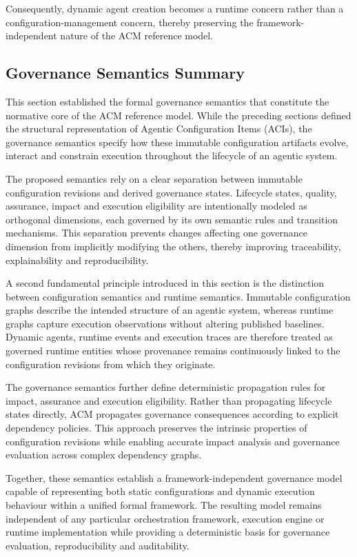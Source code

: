 \documentclass[10pt]{article}
\begin{document}
Consequently, dynamic agent creation becomes a runtime concern rather than a
configuration-management concern, thereby preserving the framework-independent
nature of the ACM reference model.

\subsection{Governance Semantics Summary}
\label{subsec:governance_summary}

This section established the formal governance semantics that constitute the
normative core of the ACM reference model. While the preceding sections defined
the structural representation of Agentic Configuration Items (ACIs), the
governance semantics specify how these immutable configuration artifacts evolve,
interact and constrain execution throughout the lifecycle of an agentic system.

The proposed semantics rely on a clear separation between immutable
configuration revisions and derived governance states. Lifecycle states,
quality, assurance, impact and execution eligibility are intentionally modeled
as orthogonal dimensions, each governed by its own semantic rules and
transition mechanisms. This separation prevents changes affecting one
governance dimension from implicitly modifying the others, thereby improving
traceability, explainability and reproducibility.

A second fundamental principle introduced in this section is the distinction
between configuration semantics and runtime semantics. Immutable configuration
graphs describe the intended structure of an agentic system, whereas runtime
graphs capture execution observations without altering published baselines.
Dynamic agents, runtime events and execution traces are therefore treated as
governed runtime entities whose provenance remains continuously linked to the
configuration revisions from which they originate.

The governance semantics further define deterministic propagation rules for
impact, assurance and execution eligibility. Rather than propagating lifecycle
states directly, ACM propagates governance consequences according to explicit
dependency policies. This approach preserves the intrinsic properties of
configuration revisions while enabling accurate impact analysis and governance
evaluation across complex dependency graphs.

Together, these semantics establish a framework-independent governance model
capable of representing both static configurations and dynamic execution
behaviour within a unified formal framework. The resulting model remains
independent of any particular orchestration framework, execution engine or
runtime implementation while providing a deterministic basis for governance
evaluation, reproducibility and auditability.
\end{document}
